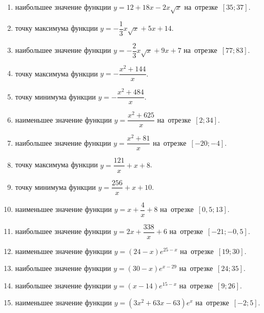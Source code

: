 \documentclass[a4paper,10pt]{article}
\begin{document}
\begin{enumerate}
\item {} наибольшее значение функции $y=12+18x -2x\sqrt{x}$ на~отрезке~$\left[35;37\right]$.

\item {} точку максимума функции $y=-\dfrac{1}{3}x\sqrt{x} +5x+14$.

\item {} наибольшее значение функции $y=-\dfrac{2}{3}x\sqrt{x} +9x+7$ на~отрезке~$\left[77;83\right]$.

\item {} точку максимума функции $y=-\dfrac{x^2 +144}{x}$.

\item {} точку минимума функции $y=-\dfrac{x^2 +484}{x}$.

\item {} наименьшее значение функции $y=\dfrac{x^2 +625}{x}$ на~отрезке~$\left[2;34\right]$.

\item {} наибольшее значение функции $y=\dfrac{x^2 +81}{x}$ на~отрезке~$\left[-20;-4\right]$.

\item {} точку максимума функции $y=\dfrac{121}{x} +x+8$.

\item {} точку минимума функции $y=\dfrac{256}{x} +x+10$.

\item {} наименьшее значение функции $y=x+\dfrac{4}{x} +8$ на~отрезке~$\left[0,5;13\right]$.

\item {} наибольшее значение функции $y=2x+\dfrac{338}{x} +6$ на~отрезке~$\left[-21;-0,5\right]$.

\item {} наименьшее значение функции $y=\left(24-x\right)e^{25-x}$ на~отрезке~$\left[19;30\right]$.

\item {} наибольшее значение функции $y=\left(30-x\right)e^{x-29}$ на~отрезке~$\left[24;35\right]$.

\item {} наибольшее значение функции $y=\left(x-14\right)e^{15-x}$ на~отрезке~$\left[9;26\right]$.

\item {} наименьшее значение функции $y=\left(3x^2 +63x -63\right)e^{x }$ на~отрезке~$\left[-2;5\right]$.


\end{enumerate}
\end{document}
